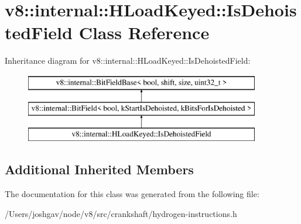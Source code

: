 \hypertarget{classv8_1_1internal_1_1_h_load_keyed_1_1_is_dehoisted_field}{}\section{v8\+:\+:internal\+:\+:H\+Load\+Keyed\+:\+:Is\+Dehoisted\+Field Class Reference}
\label{classv8_1_1internal_1_1_h_load_keyed_1_1_is_dehoisted_field}
Inheritance diagram for v8\+:\+:internal\+:\+:H\+Load\+Keyed\+:\+:Is\+Dehoisted\+Field\+:\begin{figure}[H]
\begin{center}
\leavevmode
\includegraphics[height=3.000000cm]{classv8_1_1internal_1_1_h_load_keyed_1_1_is_dehoisted_field}
\end{center}
\end{figure}
\subsection*{Additional Inherited Members}


The documentation for this class was generated from the following file\+:\begin{DoxyCompactItemize}
\item 
/\+Users/joshgav/node/v8/src/crankshaft/hydrogen-\/instructions.\+h\end{DoxyCompactItemize}
